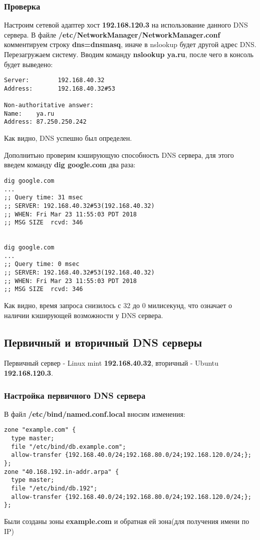 \documentclass[14pt,a4paper,report]{report}
\begin{document}
\subsubsection{Проверка}
Настроим сетевой адаптер хост \textbf{192.168.120.3} на использование данного DNS сервера. В файле \textbf{/etc/NetworkManager/NetworkManager.conf} комментируем строку \textbf{dns=dnsmasq}, иначе в nslookup будет другой адрес DNS. Перезагружаем систему. Вводим команду \textbf{nslookup ya.ru}, после чего в консоль будет выведено:
\begin{lstlisting}[language={}]
Server:        192.168.40.32
Address:       192.168.40.32#53

Non-authoritative answer:
Name:    ya.ru
Address: 87.250.250.242
\end{lstlisting}
Как видно, DNS успешно был определен.

Дополнитьно проверим кэширующую способность DNS сервера, для этого введем команду \textbf{dig google.com} два раза:
\begin{lstlisting}[language={}]
dig google.com
...
;; Query time: 31 msec
;; SERVER: 192.168.40.32#53(192.168.40.32)
;; WHEN: Fri Mar 23 11:55:03 PDT 2018
;; MSG SIZE  rcvd: 346


dig google.com
...
;; Query time: 0 msec
;; SERVER: 192.168.40.32#53(192.168.40.32)
;; WHEN: Fri Mar 23 11:55:03 PDT 2018
;; MSG SIZE  rcvd: 346
\end{lstlisting}
Как видно, время запроса снизилось с 32 до 0 милисекунд, что означает о наличии кэширующей возможности у DNS сервера.

\subsection{Первичный и вторичный DNS серверы}
Первичный сервер - Linux mint \textbf{192.168.40.32}, вторичный - Ubuntu \textbf{192.168.120.3}.
\subsubsection{Настройка первичного DNS сервера}
В файл \textbf{/etc/bind/named.conf.local} вносим изменения:
\begin{lstlisting}[language={}]
zone "example.com" {
  type master;
  file "/etc/bind/db.example.com";
  allow-transfer {192.168.40.0/24;192.168.80.0/24;192.168.120.0/24;};
};
zone "40.168.192.in-addr.arpa" {
  type master;
  file "/etc/bind/db.192";
  allow-transfer {192.168.40.0/24;192.168.80.0/24;192.168.120.0/24;};
}; 
\end{lstlisting}
Были созданы зоны \textbf{example.com} и обратная ей зона(для получения имени по IP)
\end{document}
